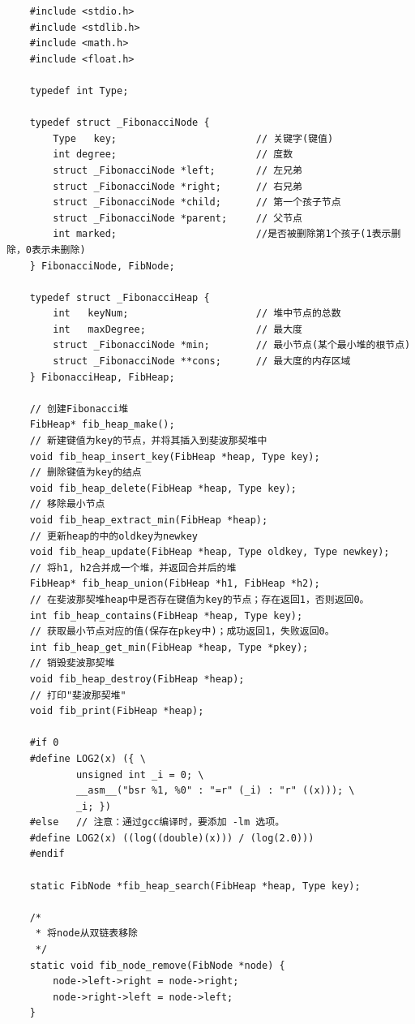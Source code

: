 \documentclass[UTF8]{ctexart}
\begin{document}
\begin{lstlisting}
    #include <stdio.h>
    #include <stdlib.h>
    #include <math.h>
    #include <float.h>
    
    typedef int Type;
    
    typedef struct _FibonacciNode {
        Type   key;                        // 关键字(键值)
        int degree;                        // 度数
        struct _FibonacciNode *left;       // 左兄弟
        struct _FibonacciNode *right;      // 右兄弟
        struct _FibonacciNode *child;      // 第一个孩子节点
        struct _FibonacciNode *parent;     // 父节点
        int marked;                        //是否被删除第1个孩子(1表示删除，0表示未删除)
    } FibonacciNode, FibNode;
    
    typedef struct _FibonacciHeap {
        int   keyNum;                      // 堆中节点的总数
        int   maxDegree;                   // 最大度
        struct _FibonacciNode *min;        // 最小节点(某个最小堆的根节点)
        struct _FibonacciNode **cons;      // 最大度的内存区域
    } FibonacciHeap, FibHeap;
    
    // 创建Fibonacci堆
    FibHeap* fib_heap_make();
    // 新建键值为key的节点，并将其插入到斐波那契堆中
    void fib_heap_insert_key(FibHeap *heap, Type key);
    // 删除键值为key的结点
    void fib_heap_delete(FibHeap *heap, Type key);
    // 移除最小节点
    void fib_heap_extract_min(FibHeap *heap);
    // 更新heap的中的oldkey为newkey
    void fib_heap_update(FibHeap *heap, Type oldkey, Type newkey);
    // 将h1, h2合并成一个堆，并返回合并后的堆
    FibHeap* fib_heap_union(FibHeap *h1, FibHeap *h2);
    // 在斐波那契堆heap中是否存在键值为key的节点；存在返回1，否则返回0。
    int fib_heap_contains(FibHeap *heap, Type key);
    // 获取最小节点对应的值(保存在pkey中)；成功返回1，失败返回0。
    int fib_heap_get_min(FibHeap *heap, Type *pkey);
    // 销毁斐波那契堆
    void fib_heap_destroy(FibHeap *heap);
    // 打印"斐波那契堆"
    void fib_print(FibHeap *heap);
    
    #if 0
    #define LOG2(x) ({ \
            unsigned int _i = 0; \
            __asm__("bsr %1, %0" : "=r" (_i) : "r" ((x))); \
            _i; })
    #else   // 注意：通过gcc编译时，要添加 -lm 选项。
    #define LOG2(x) ((log((double)(x))) / (log(2.0)))
    #endif
    
    static FibNode *fib_heap_search(FibHeap *heap, Type key);
    
    /*
     * 将node从双链表移除
     */
    static void fib_node_remove(FibNode *node) {
        node->left->right = node->right;
        node->right->left = node->left;
    }
    

\end{lstlisting}
\end{document}
